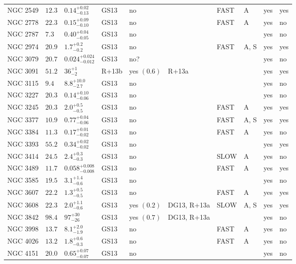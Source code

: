 \begin{table*}
\begin{center}
\begin{tabular}{llllllllll}
NGC 2549  &  $12.3$  &  $0.14_{-0.13}^{+0.02}$   &  GS13  &  no   &     &  FAST   &  A  &  yes  &  yes  \\ 
NGC 2778  &  $22.3$  &  $0.15_{-0.10}^{+0.09}$   &  GS13  &  no   &     &  FAST   &  A  &  yes  &  no  \\ 
NGC 2787  &  $7.3$  &  $0.40_{-0.05}^{+0.04}$   &  GS13  &  no   &     &      &     &  yes  &  no  \\ 
NGC 2974  &  $20.9$  &  $1.7_{-0.2}^{+0.2}$   &  GS13  &  no   &     &  FAST   &  A, S  &  yes  &  yes  \\ 
NGC 3079  &  $20.7$  &  $0.024_{-0.012}^{+0.024}$   &  GS13  &  no?  &     &      &     &  yes  &  no  \\ 
NGC 3091  &  $51.2$  &  $36_{-2}^{+1}$   &  R+13b  &  yes  $(0.6)$  &  R+13a  &      &     &  yes  &  yes  \\ 
NGC 3115  &  $9.4$  &  $8.8_{-2.7}^{+10.0}$   &  GS13  &  no   &     &      &     &  yes  &  no  \\ 
NGC 3227  &  $20.3$  &  $0.14_{-0.06}^{+0.10}$   &  GS13  &  no   &     &      &     &  yes  &  no  \\ 
NGC 3245  &  $20.3$  &  $2.0_{-0.5}^{+0.5}$   &  GS13  &  no   &     &  FAST   &  A  &  yes  &  yes  \\ 
NGC 3377  &  $10.9$  &  $0.77_{-0.06}^{+0.04}$   &  GS13  &  no   &     &  FAST   &  A, S  &  yes  &  yes  \\ 
NGC 3384  &  $11.3$  &  $0.17_{-0.02}^{+0.01}$   &  GS13  &  no   &     &  FAST   &  A  &  yes  &  no  \\ 
NGC 3393  &  $55.2$  &  $0.34_{-0.02}^{+0.02}$   &  GS13  &  no   &     &      &     &  yes  &  yes  \\ 
NGC 3414  &  $24.5$  &  $2.4_{-0.3}^{+0.3}$   &  GS13  &  no   &     &   SLOW  &  A  &  yes  &  no  \\ 
NGC 3489  &  $11.7$  &  $0.058_{-0.008}^{+0.008}$   &  GS13  &  no   &     &  FAST   &  A  &  yes  &  yes  \\ 
NGC 3585  &  $19.5$  &  $3.1_{-0.6}^{+1.4}$   &  GS13  &  no   &     &      &     &  yes  &  no  \\ 
NGC 3607  &  $22.2$  &  $1.3_{-0.5}^{+0.5}$   &  GS13  &  no   &     &  FAST   &  A  &  yes  &  yes  \\ 
NGC 3608  &  $22.3$  &  $2.0_{-0.6}^{+1.1}$   &  GS13  &  yes  $(0.2)$  &  DG13, R+13a  &   SLOW  &  A, S  &  yes  &  yes  \\ 
NGC 3842  &  $98.4$  &  $97_{-26}^{+30}$   &  GS13  &  yes  $(0.7)$  &  DG13, R+13a  &      &     &  yes  &  no  \\ 
NGC 3998  &  $13.7$  &  $8.1_{-1.9}^{+2.0}$   &  GS13  &  no   &     &  FAST   &  A  &  yes  &  no  \\ 
NGC 4026  &  $13.2$  &  $1.8_{-0.3}^{+0.6}$   &  GS13  &  no   &     &  FAST   &  A  &  yes  &  no  \\ 
NGC 4151  &  $20.0$  &  $0.65_{-0.07}^{+0.07}$   &  GS13  &  no   &     &      &     &  yes  &  no  \\ 
\hline         
\end{tabular}   
\label{tab:sample} 
\end{center}    
\end{table*}    

